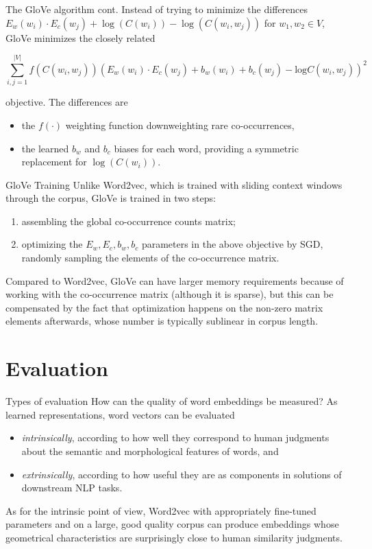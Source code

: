\documentclass[style=upen, size=14pt]{powerdot}
\newcommand{\gold}{\color{arany}}
\theoremstyle{definition}
\begin{document}
\begin{slide}[toc=]{The GloVe algorithm cont.}
  Instead of trying to minimize the differences
  $E_w(w_i) \cdot E_c(w_j) + \log (C(w_i)) - \log (C(w_i, w_j))$ for
  $w_1,w_2\in V$, GloVe minimizes the closely related
  \begin{small}
  $$
  \sum\limits_{i, j=1}^{|V|} f(C(w_i,w_j)) (E_w(w_i)\cdot E_c({w}_j) + b_w(w_i) +
  {b_c}(w_j) - \text{log} C(w_i, w_j))^2
  $$
  \end{small}
  objective. The differences are
  \begin{itemize}
  \item the $f(\cdot)$ weighting function downweighting rare co-occurrences,
  \item the learned $b_w$ and $b_c$ biases for each word, providing a symmetric
    replacement for $\log(C(w_i))$.
  \end{itemize}
\end{slide}

\begin{slide}[toc=]{GloVe Training}
  Unlike Word2vec, which is trained with sliding context windows through the
  corpus, GloVe is trained in two steps:
  \begin{enumerate}
  \item assembling the global co-occurrence counts matrix;
  \item optimizing the $E_w, E_c, b_w, b_c$ parameters in the above objective by
    SGD, randomly sampling the elements of the co-occurrence matrix.
  \end{enumerate}
  Compared to Word2vec, GloVe can have larger memory requirements because of
  working with the co-occurrence matrix (although it is sparse), but this can be
  compensated by the fact that optimization happens on the non-zero matrix
  elements afterwards, whose number is typically sublinear in corpus length.
\end{slide}

\section{Evaluation}

\begin{slide}[toc=Evaluation types]{Types of evaluation}
  How can the quality of word embeddings be measured? As learned
  representations, word vectors can be evaluated
  \begin{itemize}
  \item \emph{\gold intrinsically}, according to how well they correspond to
    human judgments about the semantic and morphological features of words, and
  \item \emph{\gold extrinsically}, according to how useful they are as
    components in solutions of downstream NLP tasks.
  \end{itemize}
  As for the intrinsic point of view, Word2vec with appropriately fine-tuned
  parameters and on a large, good quality corpus can produce embeddings whose
  geometrical characteristics are surprisingly close to human similarity
  judgments.
\end{slide}
\end{document}
